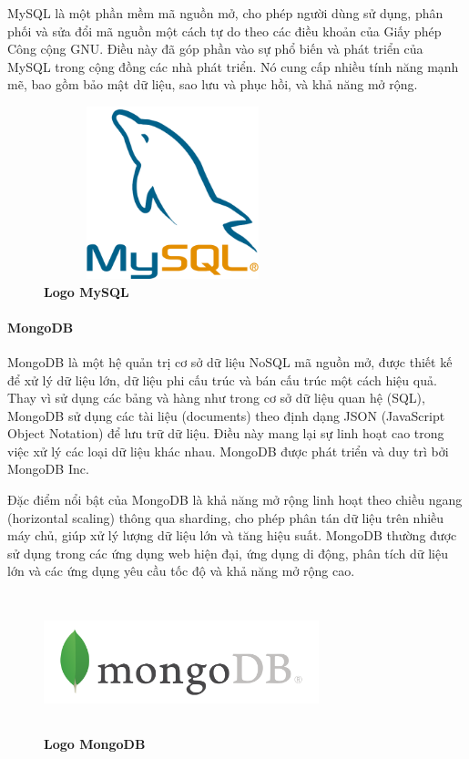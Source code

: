 MySQL là một phần mềm mã nguồn mở, cho phép người dùng sử dụng, phân phối và sửa đổi mã nguồn một cách tự do theo các điều khoản của Giấy phép Công cộng GNU. Điều này đã góp phần vào sự phổ biến và phát triển của MySQL trong cộng đồng các nhà phát triển. Nó cung cấp nhiều tính năng mạnh mẽ, bao gồm bảo mật dữ liệu, sao lưu và phục hồi, và khả năng mở rộng.

\begin{figure}[H]
	\centering
	\includegraphics[width=7.5cm,height=5cm]{Images/Technology/mysql.png}
	\caption[Logo MySQL]{\bfseries \fontsize{12pt}{0pt}
		\selectfont Logo MySQL}
	\label{mysql} %
\end{figure}

\paragraph{MongoDB}
\mbox{}

MongoDB là một hệ quản trị cơ sở dữ liệu NoSQL mã nguồn mở, được thiết kế để xử lý dữ liệu lớn, dữ liệu phi cấu trúc và bán cấu trúc một cách hiệu quả. Thay vì sử dụng các bảng và hàng như trong cơ sở dữ liệu quan hệ (SQL), MongoDB sử dụng các tài liệu (documents) theo định dạng JSON (JavaScript Object Notation) để lưu trữ dữ liệu. Điều này mang lại sự linh hoạt cao trong việc xử lý các loại dữ liệu khác nhau. MongoDB được phát triển và duy trì bởi MongoDB Inc.

Đặc điểm nổi bật của MongoDB là khả năng mở rộng linh hoạt theo chiều ngang (horizontal scaling) thông qua sharding, cho phép phân tán dữ liệu trên nhiều máy chủ, giúp xử lý lượng dữ liệu lớn và tăng hiệu suất. MongoDB thường được sử dụng trong các ứng dụng web hiện đại, ứng dụng di động, phân tích dữ liệu lớn và các ứng dụng yêu cầu tốc độ và khả năng mở rộng cao.

\begin{figure}[H]
	\centering
	\includegraphics[width=8cm,height=4cm]{Images/Technology/mongo.png}
	\caption[Logo MongoDB]{\bfseries \fontsize{12pt}{0pt}
		\selectfont Logo MongoDB}
	\label{mongodb} %
\end{figure}

